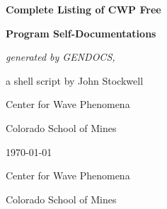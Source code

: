 \begin{titlepage}

\vspace*{2.5 in}
\centerline{\Huge\bf Complete Listing of CWP Free}
\centerline{\Huge\bf Program Self-Documentations}
\vspace{0.5in}
\centerline{\Large \em generated by GENDOCS,}
\centerline{\Large a shell script by John Stockwell}
\centerline{\large Center for Wave Phenomena}
\centerline{\large Colorado School of Mines}
\vspace{0.5in}
\centerline{\today}

\vfill

\centerline{\epsfysize=0.675in }
\vspace{1ex}
\centerline{Center for Wave Phenomena}
\centerline{Colorado School of Mines}

\end{titlepage}
 
